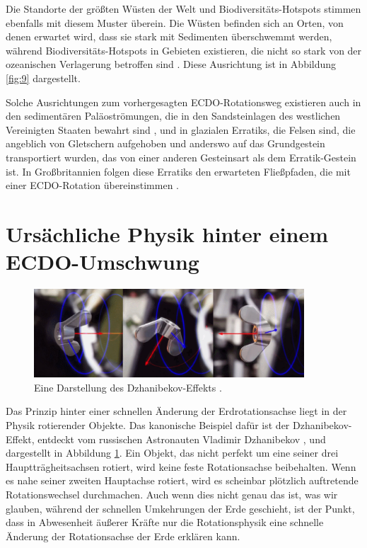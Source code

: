 \documentclass[10pt,twocolumn,letterpaper]{article}
\begin{document}
Die Standorte der größten Wüsten der Welt und Biodiversitäts-Hotspots stimmen ebenfalls mit diesem Muster überein. Die Wüsten befinden sich an Orten, von denen erwartet wird, dass sie stark mit Sedimenten überschwemmt werden, während Biodiversitäts-Hotspots in Gebieten existieren, die nicht so stark von der ozeanischen Verlagerung betroffen sind \cite{28}. Diese Ausrichtung ist in Abbildung \ref{fig:9} dargestellt.

Solche Ausrichtungen zum vorhergesagten ECDO-Rotationsweg existieren auch in den sedimentären Paläoströmungen, die in den Sandsteinlagen des westlichen Vereinigten Staaten bewahrt sind \cite{21}, und in glazialen Erratiks, die Felsen sind, die angeblich von Gletschern aufgehoben und anderswo auf das Grundgestein transportiert wurden, das von einer anderen Gesteinsart als dem Erratik-Gestein ist. In Großbritannien folgen diese Erratiks den erwarteten Fließpfaden, die mit einer ECDO-Rotation übereinstimmen \cite{67,68}.

\section{Ursächliche Physik hinter einem ECDO-Umschwung}

\begin{figure}[b]
\begin{center}
\includegraphics[width=0.9\textwidth]{dzhani.jpg}
\end{center}
   \caption{Eine Darstellung des Dzhanibekov-Effekts \cite{28}.}
\label{fig:10}
\end{figure}

Das Prinzip hinter einer schnellen Änderung der Erdrotationsachse liegt in der Physik rotierender Objekte. Das kanonische Beispiel dafür ist der Dzhanibekov-Effekt, entdeckt vom russischen Astronauten Vladimir Dzhanibekov \cite{37}, und dargestellt in Abbildung \ref{fig:10}. Ein Objekt, das nicht perfekt um eine seiner drei Hauptträgheitsachsen rotiert, wird keine feste Rotationsachse beibehalten. Wenn es nahe seiner zweiten Hauptachse rotiert, wird es scheinbar plötzlich auftretende Rotationswechsel durchmachen. Auch wenn dies nicht genau das ist, was wir glauben, während der schnellen Umkehrungen der Erde geschieht, ist der Punkt, dass in Abwesenheit äußerer Kräfte nur die Rotationsphysik eine schnelle Änderung der Rotationsachse der Erde erklären kann.
\end{document}
